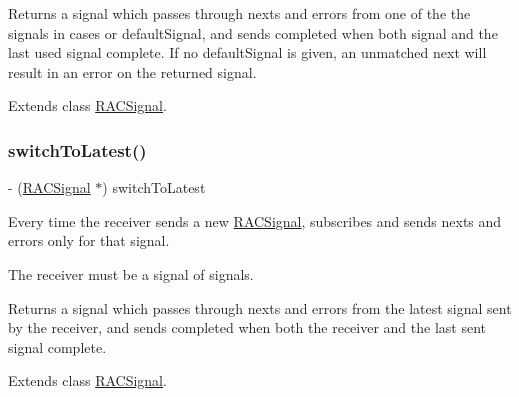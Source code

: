 Returns a signal which passes through {\ttfamily next}s and {\ttfamily error}s from one of the the signals in {\ttfamily cases} or {\ttfamily default\+Signal}, and sends {\ttfamily completed} when both {\ttfamily signal} and the last used signal complete. If no {\ttfamily default\+Signal} is given, an unmatched {\ttfamily next} will result in an error on the returned signal. 

Extends class \mbox{\hyperlink{interface_r_a_c_signal_aac7816b22cfdcbe65cd43d99836ba1f5}{R\+A\+C\+Signal}}.

\mbox{\label{category_r_a_c_signal_07_operations_08_a0a6780c4580e1a5338a9a891f7c69ea1}} 
\subsubsection{\texorpdfstring{switch\+To\+Latest()}{switchToLatest()}\hspace{0.1cm}{\footnotesize\ttfamily [1/3]}}
{\footnotesize\ttfamily -\/ (\mbox{\hyperlink{interface_r_a_c_signal}{R\+A\+C\+Signal}} $\ast$) switch\+To\+Latest \begin{DoxyParamCaption}{ }\end{DoxyParamCaption}}

Every time the receiver sends a new \mbox{\hyperlink{interface_r_a_c_signal}{R\+A\+C\+Signal}}, subscribes and sends {\ttfamily next}s and {\ttfamily error}s only for that signal.

The receiver must be a signal of signals.

Returns a signal which passes through {\ttfamily next}s and {\ttfamily error}s from the latest signal sent by the receiver, and sends {\ttfamily completed} when both the receiver and the last sent signal complete. 

Extends class \mbox{\hyperlink{interface_r_a_c_signal_a0a6780c4580e1a5338a9a891f7c69ea1}{R\+A\+C\+Signal}}.

\mbox{\label{category_r_a_c_signal_07_operations_08_a0a6780c4580e1a5338a9a891f7c69ea1}} 
